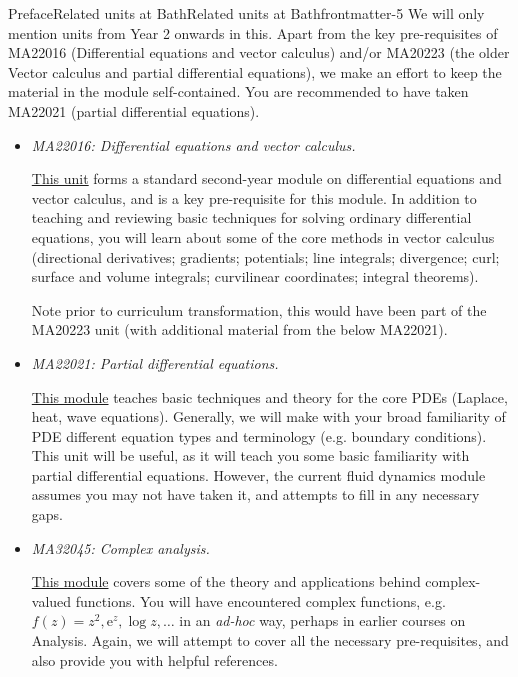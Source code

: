 \documentclass[oneside,10pt,]{book}
\newcommand{\lititle}[1]{{\slshape#1}}
\numberwithin{equation}{section}
\newcommand{\e}{\mathrm{e}}
\begin{document}
%
%
\typeout{************************************************}
\typeout{************************************************}
%
\begin{preface}{Preface}{Related units at Bath}{}{Related units at Bath}{}{}{frontmatter-5}
We will only mention units from Year 2 onwards in this. Apart from the key pre-requisites of MA22016 (Differential equations and vector calculus) and\slash{}or MA20223 (the older Vector calculus and partial differential equations), we make an effort to keep the material in the module self-contained. You are recommended to have taken MA22021 (partial differential equations).%
\par
%
\begin{itemize}[label=\textbullet]
\item{}\lititle{MA22016: Differential equations and vector calculus.}\par%
\href{https://www.bath.ac.uk/catalogues/2024-2025/ma/MA22016.html}{This unit} forms a standard second-year module on differential equations and vector calculus, and is a key pre-requisite for this module. In addition to teaching and reviewing basic techniques for solving ordinary differential equations, you will learn about some of the core methods in vector calculus (directional derivatives; gradients; potentials; line integrals; divergence; curl; surface and volume integrals; curvilinear coordinates; integral theorems).%
\par
Note prior to curriculum transformation, this would have been part of the MA20223 unit (with additional material from the below MA22021).%
\item{}\lititle{MA22021: Partial differential equations.}\par%
\href{https://www.bath.ac.uk/catalogues/2024-2025/ma/MA22021.html}{This module} teaches basic techniques and theory for the core PDEs (Laplace, heat, wave equations). Generally, we will make with your broad familiarity of PDE different equation types and terminology (e.g. boundary conditions). This unit will be useful, as it will teach you some basic familiarity with partial differential equations. However, the current fluid dynamics module assumes you may not have taken it, and attempts to fill in any necessary gaps.%
\item{}\lititle{MA32045: Complex analysis.}\par%
\href{https://www.bath.ac.uk/catalogues/2025-2026/ma/MA32045.html}{This module} covers some of the theory and applications behind complex-valued functions. You will have encountered complex functions, e.g. \(f(z) = z^2, \e^z, \log z, \ldots\) in an \emph{ad-hoc} way, perhaps in earlier courses on Analysis. Again, we will attempt to cover all the necessary pre-requisites, and also provide you with helpful references.%
\end{itemize}
%
\end{preface}
\end{document}

